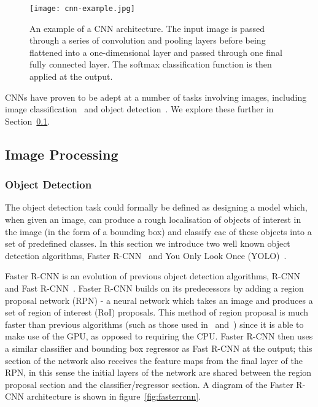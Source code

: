 \documentclass[../interim.tex]{subfiles}
\begin{document}
\begin{figure}
  \centering
  \texttt{[image: cnn-example.jpg]}
  \caption{An example of a CNN architecture. The input image is passed through a series of convolution and pooling layers before being flattened into a one-dimensional layer and passed through one final fully connected layer. The softmax classification function is then applied at the output.}
  \label{fig:example-cnn}
\end{figure}

CNNs have proven to be adept at a number of tasks involving images, including image classification~\cite{cnn-uses:classification} and object detection~\cite{cnn-uses:yolo-v3}\cite{cnn-uses:faster-r-cnn}. We explore these further in Section~\ref{section:image-proc}.


\subsection{Image Processing}
\label{section:image-proc}

\subsubsection{Object Detection}

The object detection task could formally be defined as designing a model which, when given an image, can produce a rough localisation of objects of interest in the image (in the form of a bounding box) and classify eac of these objects into a set of predefined classes. In this section we introduce two well known object detection algorithms, Faster R-CNN~\cite{cnn-uses:faster-r-cnn} and You Only Look Once (YOLO)~\cite{cnn-uses:yolo-v3}.

Faster R-CNN is an evolution of previous object detection algorithms, R-CNN~\cite{r-cnn} and Fast R-CNN~\cite{fast-r-cnn}. Faster R-CNN builds on its predecessors by adding a region proposal network (RPN) - a neural network which takes an image and produces a set of region of interest (RoI) proposals. This method of region proposal is much faster than previous algorithms (such as those used in~\cite{r-cnn} and~\cite{fast-r-cnn}) since it is able to make use of the GPU, as opposed to requiring the CPU. Faster R-CNN then uses a similar classifier and bounding box regressor as Fast R-CNN at the output; this section of the network also receives the feature maps from the final layer of the RPN, in this sense the initial layers of the network are shared between the region proposal section and the classifier/regressor section. A diagram of the Faster R-CNN architecture is shown in figure~\ref{fig:fasterrcnn}.
\end{document}
